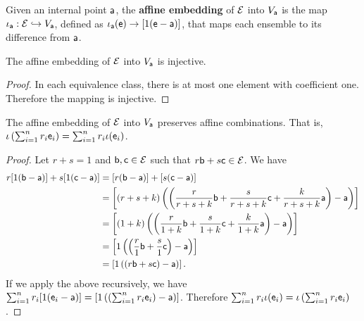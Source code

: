 \begin{mathSection}
	\begin{defn}
		Given an internal point $\ens[a]$, the \textbf{affine embedding} of $\Ens$ into $V_{\ens[a]}$ is the map $\iota_{\ens[a]} : \Ens \hookrightarrow V_{\ens[a]}$, defined as $\iota_{\ens[a]}(\ens) \to [1(\ens - \ens[a])]$, that maps each ensemble to its difference from $\ens[a]$.
	\end{defn}
	
	\begin{coro}
		The affine embedding of $\Ens$ into $V_{\ens[a]}$  is injective.
	\end{coro}
	
	\begin{proof}
		In each equivalence class, there is at most one element with coefficient one. Therefore the mapping is injective.
	\end{proof}
	
	\begin{coro}
		The affine embedding of $\Ens$ into $V_{\ens[a]}$ preserves affine combinations. That is, $\iota\left(\sum_{i=1}^n r_i \ens_i \right) = \sum_{i=1}^n r_i \iota(\ens_i)$.
	\end{coro}
	
	\begin{proof}
		Let $r+s=1$ and $\ens[b], \ens[c] \in \Ens$ such that $r\ens[b] + s \ens[c] \in \Ens$. We have
		\begin{equation}
			\begin{aligned}
				r[1(\ens[b] - \ens[a])] +s[1(\ens[c] - \ens[a])] &= [r(\ens[b] - \ens[a])] +[s(\ens[c] - \ens[a])] \\
				&= \left[(r+s+k) \left(\left(\frac{r}{r+s+k}\ens[b] + \frac{s}{r+s+k} \ens[c] +\frac{k}{r+s+k} \ens[a] \right) - \ens[a]\right)\right] \\
				&= \left[(1+k) \left(\left(\frac{r}{1+k}\ens[b] + \frac{s}{1+k} \ens[c] +\frac{k}{1+k} \ens[a] \right) - \ens[a]\right)\right] \\
				&= \left[1 \left(\left(\frac{r}{1}\ens[b] + \frac{s}{1} \ens[c] \right) - \ens[a]\right)\right] \\
				&= \left[1\left(\left(r\ens[b] + s \ens[c] \right) - \ens[a]\right)\right].
			\end{aligned}
		\end{equation}
		If we apply the above recursively, we have $\sum_{i=1}^{n} r_i [1(\ens_i - \ens[a])] = \left[1\left(\left(\sum_{i=1}^{n}r_i \ens_i\right) - \ens[a]\right)\right]$. Therefore $\sum_{i=1}^n r_i \iota(\ens_i) = \iota\left(\sum_{i=1}^n r_i \ens_i \right)$.
	\end{proof}
	

\end{mathSection}
